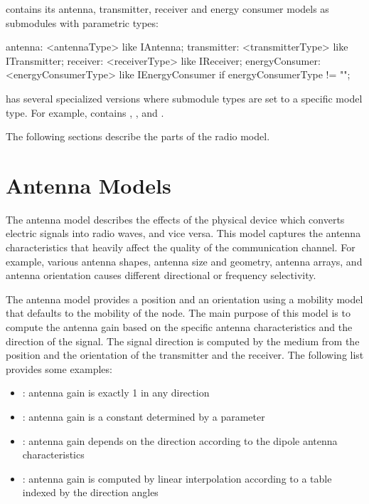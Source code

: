  contains its antenna, transmitter, receiver and energy
consumer models as submodules with parametric types:

\begin{ned}
antenna: <antennaType> like IAntenna;
transmitter: <transmitterType> like ITransmitter;
receiver: <receiverType> like IReceiver;
energyConsumer: <energyConsumerType> like IEnergyConsumer 
    if energyConsumerType != "";
\end{ned}

 has several specialized versions where submodule types
are set to a specific model type. For example,  
contains , ,
and . 


The following sections describe the parts of the radio model.

\section{Antenna Models}

The antenna model describes the effects of the physical device which converts
electric signals into radio waves, and vice versa. This model captures the
antenna characteristics that heavily affect the quality of the communication
channel. For example, various antenna shapes, antenna size and geometry, antenna
arrays, and antenna orientation causes different directional or frequency
selectivity.

The antenna model provides a position and an orientation using a mobility model
that defaults to the mobility of the node. The main purpose of this model is to
compute the antenna gain based on the specific antenna characteristics and the
direction of the signal. The signal direction is computed by the medium from the
position and the orientation of the transmitter and the receiver. The following
list provides some examples:

\begin{itemize}
  \item {}: antenna gain is exactly 1 in any direction
  \item {}: antenna gain is a constant determined by
    a parameter
  \item {}: antenna gain depends on the direction according
    to the dipole antenna characteristics
  \item {}: antenna gain is computed by linear
    interpolation according to a table indexed by the direction angles
\end{itemize}

